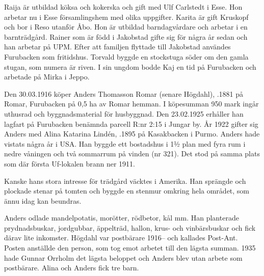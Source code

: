 
Raija är utbildad köksa och kokerska och gift med Ulf Carlstedt i Esse.	Hon arbetar nu i Esse församlingshem med olika uppgifter. Karita är 	gift Kruskopf och bor i Reso utanför Åbo. Hon är utbildad barndagvårdare och arbetar i en barnträdgård. Rainer som är född i Jakobstad gifte sig för några år sedan och han arbetar på UPM. Efter att familjen flyttade till Jakobstad användes Furubacken	som fritidshus. Torvald byggde en stockstuga söder om den gamla stugan, som numera är riven. I sin ungdom bodde Kaj en tid på Furubacken och arbetade på Mirka i Jeppo.


Den 30.03.1916 köper Anders Thomasson Romar (senare Högdahl),	.1881 på Romar, Furubacken på 0,5 ha av Romar hemman. I köpesumman 950 mark	ingår uthusrad och byggnadsmaterial för husbyggnad. Den 23.02.1925 erhåller han lagfart på Furubacken benämnda parcell R:nr 2:15 i Jungar by. År 1922 gifter sig Anders med Alina Katarina Lindén, .1895 på Kasakbacken i Purmo. Anders hade vistats några år i USA. Han byggde ett bostadshus i 1½ plan med fyra rum i nedre våningen och två sommarrum på vinden (nr 321). Det stod på samma plats som där första Uf-lokalen brann ner 1911.

Kanske hans stora intresse för trädgård väcktes i Amerika. Han sprängde och plockade stenar på tomten och byggde en stenmur omkring hela området, som ännu idag kan beundras.


Anders odlade mandelpotatis, morötter, rödbetor, kål mm. Han planterade prydnadsbuskar, jordgubbar, äppelträd, hallon, krus- och vinbärsbuskar och fick därav lite inkomster. Högdahl var postbärare 1916-- och kallades Post-Ant. Posten anställde den person, som tog emot arbetet till den lägsta 	summan. 1935 hade Gunnar Orrholm det lägsta beloppet och Anders blev utan arbete som postbärare. Alina och Anders fick tre barn.
\begin{jhchildren}
  \item {}
  \item {}
  \item {}
\end{jhchildren}

